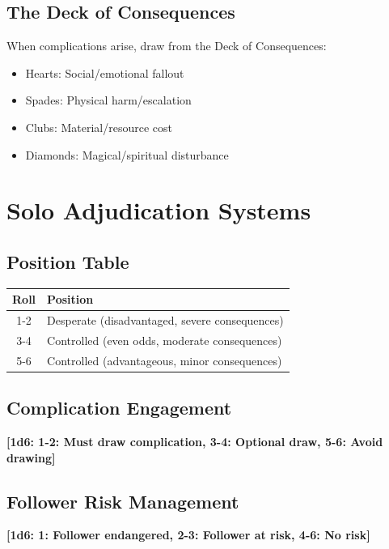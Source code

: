 \documentclass[11pt]{article}
\newcommand{\dice}[1]{\textbf{[1d6: #1]}}
\begin{document}
\subsection{The Deck of Consequences}

When complications arise, draw from the Deck of Consequences:
\begin{itemize}
    \item Hearts: Social/emotional fallout
    \item Spades: Physical harm/escalation
    \item Clubs: Material/resource cost
    \item Diamonds: Magical/spiritual disturbance
\end{itemize}

\section{Solo Adjudication Systems}

\subsection{Position Table}

\begin{center}
\begin{tabular}{cl}
\toprule
\textbf{Roll} & \textbf{Position} \\
\midrule
1-2 & Desperate (disadvantaged, severe consequences) \\
3-4 & Controlled (even odds, moderate consequences) \\
5-6 & Controlled (advantageous, minor consequences) \\
\bottomrule
\end{tabular}
\end{center}

\subsection{Complication Engagement}

\dice{1-2: Must draw complication, 3-4: Optional draw, 5-6: Avoid drawing}

\subsection{Follower Risk Management}

\dice{1: Follower endangered, 2-3: Follower at risk, 4-6: No risk}
\end{document}
